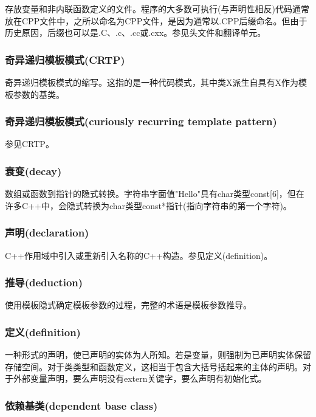 存放变量和非内联函数定义的文件。程序的大多数可执行(与声明性相反)代码通常放在CPP文件中，之所以命名为CPP文件，是因为通常以.CPP后缀命名。但由于历史原因，后缀也可以是.C、.c、.cc或.cxx。参见头文件和翻译单元。

\subsubsection{奇异递归模板模式(CRTP)}

奇异递归模板模式的缩写。这指的是一种代码模式，其中类X派生自具有X作为模板参数的基类。

\subsubsection{奇异递归模板模式(curiously recurring template pattern)}

参见CRTP。

\subsubsection{衰变(decay)}

数组或函数到指针的隐式转换。字符串字面值"Hello"具有char类型const[6]，但在许多C++中，会隐式转换为char类型const*指针(指向字符串的第一个字符)。

\subsubsection{声明(declaration)}

C++作用域中引入或重新引入名称的C++构造。参见定义(definition)。

\subsubsection{推导(deduction)}

使用模板隐式确定模板参数的过程，完整的术语是模板参数推导。

\subsubsection{定义(definition)}

一种形式的声明，使已声明的实体为人所知。若是变量，则强制为已声明实体保留存储空间。对于类类型和函数定义，这相当于包含大括号括起来的主体的声明。对于外部变量声明，要么声明没有extern关键字，要么声明有初始化式。

\subsubsection{依赖基类(dependent base class)}

